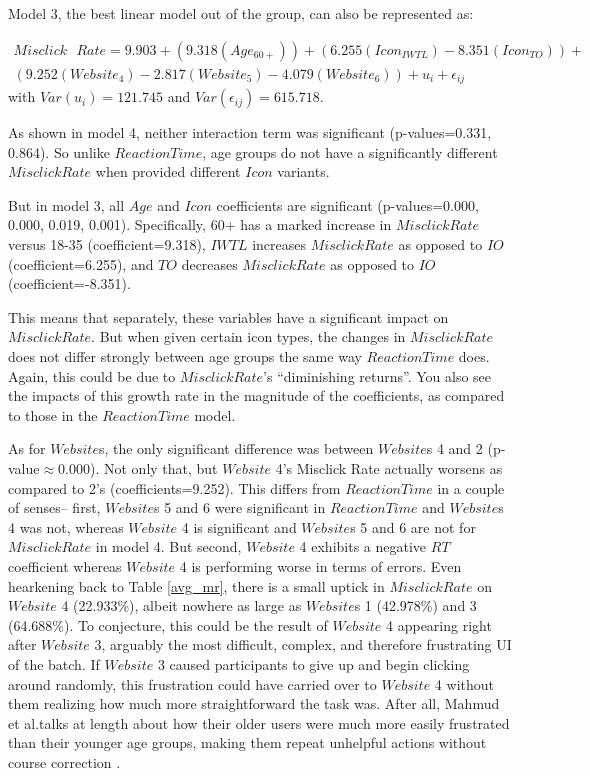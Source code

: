\documentclass[12pt,twoside]{reedthesis}
\begin{document}
    Model 3, the best linear model out of the group, can also be represented as:

    \begin{gather*}
        Misclick\text{ }Rate = 9.903 + (9.318(Age_{60+})) + (6.255(Icon_{IWTL}) - 8.351(Icon_{TO})) + \\(9.252(Website_4) -2.817(Website_5) -4.079(Website_6)) + u_i + \epsilon_{ij}
    \end{gather*}
    \bigbreak
    with $Var(u_i)=121.745$ and $Var(\epsilon_{ij})=615.718$.
    
    As shown in model 4, neither interaction term was significant (p-values=0.331, 0.864). So unlike $ReactionTime$, age groups do not have a significantly different $Misclick Rate$ when provided different $Icon$ variants. 

    But in model 3, all $Age$ and $Icon$ coefficients are significant (p-values=0.000, 0.000, 0.019, 0.001). Specifically, 60+ has a marked increase in $Misclick Rate$ versus 18-35 (coefficient=9.318), $IWTL$ increases $Misclick Rate$ as opposed to $IO$ (coefficient=6.255), and $TO$ decreases $Misclick Rate$ as opposed to $IO$ (coefficient=-8.351). 

    This means that separately, these variables have a significant impact on $Misclick Rate$. But when given certain icon types, the changes in $Misclick Rate$ does not differ strongly between age groups the same way $ReactionTime$ does. Again, this could be due to $Misclick Rate$'s \enquote{diminishing returns}. You also see the impacts of this growth rate in the magnitude of the coefficients, as compared to those in the $ReactionTime$ model.

    As for $Website$s, the only significant difference was between $Website$s 4 and 2 (p-value$\approx0.000$). Not only that, but $Website$ 4's Misclick Rate actually worsens as compared to 2's (coefficients=9.252). This differs from $ReactionTime$ in a couple of senses-- first, $Website$s 5 and 6 were significant in $ReactionTime$ and $Website$s 4 was not, whereas $Website$ 4 is significant and $Website$s 5 and 6 are not for $Misclick Rate$ in model 4. But second, $Website$ 4 exhibits a negative $RT$ coefficient whereas $Website$ 4 is performing worse in terms of errors. Even hearkening back to Table \ref{avg_mr}, there is a small uptick in $Misclick Rate$ on $Website$ 4 (22.933\%), albeit nowhere as large as $Website$s 1 (42.978\%) and 3 (64.688\%). To conjecture, this could be the result of $Website$ 4 appearing right after $Website$ 3, arguably the most difficult, complex, and therefore frustrating UI of the batch. If $Website$ 3 caused participants to give up and begin clicking around randomly, this frustration could have carried over to $Website$ 4 without them realizing how much more straightforward the task was. After all, Mahmud et al.\@ talks at length about how their older users were much more easily frustrated than their younger age groups, making them repeat unhelpful actions without course correction \cite{mahmud_learning_2020}.
\end{document}
